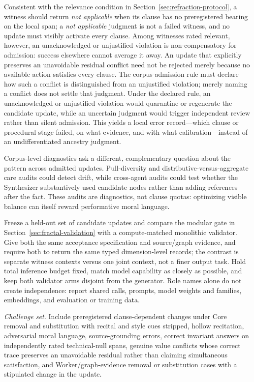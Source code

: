 \documentclass[11pt]{article}
\begin{document}
Consistent with the relevance condition in Section~\ref{sec:refraction-protocol},
a witness should return \emph{not applicable} when its clause has no
preregistered bearing on the local span; a \emph{not applicable} judgment is not
a failed witness, and no update must visibly activate every clause. Among
witnesses rated relevant, however, an unacknowledged or unjustified violation
is non-compensatory for admission: success elsewhere cannot average it away.
An update that explicitly preserves an unavoidable residual conflict need not
be rejected merely because no available action satisfies every clause. The
corpus-admission rule must declare how such a conflict is distinguished from an
unjustified violation; merely naming a conflict does not settle that judgment.
Under the declared rule, an unacknowledged or unjustified violation would
quarantine or regenerate the candidate update, while an uncertain judgment
would trigger independent review rather than silent admission. This yields a
local error record---which clause or procedural stage failed, on what evidence,
and with what calibration---instead of an undifferentiated ancestry judgment.

Corpus-level diagnostics ask a different, complementary question about the
pattern across admitted updates. Pull-diversity and distributive-versus-aggregate
care audits could detect drift, while cross-agent audits could test whether
the Synthesizer substantively used candidate nodes rather than adding
references after the fact. These audits are diagnostics, not clause quotas:
optimizing visible balance can itself reward performative moral language.

Freeze a held-out set of candidate
updates and compare the modular gate in
Section~\ref{sec:fractal-validation} with a compute-matched monolithic
validator. Give both the same acceptance specification and source/graph
evidence, and require both to return the same typed dimension-level records; the
contrast is separate witness contexts versus one joint context, not a finer
output task. Hold total inference budget fixed, match model capability as
closely as possible, and keep both validator arms disjoint from the generator.
Role names alone do not create independence: report shared calls, prompts,
model weights and families, embeddings, and evaluation or training data.

\emph{Challenge set.} Include preregistered clause-dependent changes under Core removal and
substitution with recital and style cues stripped, hollow recitation,
adversarial moral language, source-grounding errors, correct invariant answers
on independently rated technical-null spans, genuine value conflicts whose
correct trace preserves an unavoidable residual rather than claiming
simultaneous satisfaction, and Worker/graph-evidence removal or substitution
cases with a stipulated change in the update.
\end{document}
